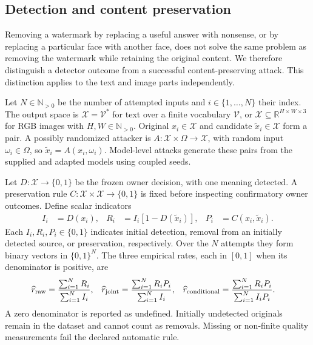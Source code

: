 \subsection{Detection and content preservation}
\label{sec:preservation}
Removing a watermark by replacing a useful answer with nonsense, or by replacing a particular face with another face, does not solve the same problem as removing the watermark while retaining the original content. We therefore distinguish a detector outcome from a successful content-preserving attack. This distinction applies to the text and image parts independently.

Let $N\in\mathbb N_{>0}$ be the number of attempted inputs and $i\in\{1,\ldots,N\}$ their index. The output space is $\mathcal X=\mathcal V^*$ for text over a finite vocabulary $\mathcal V$, or $\mathcal X\subseteq\mathbb R^{H\times W\times3}$ for RGB images with $H,W\in\mathbb N_{>0}$. Original $x_i\in\mathcal X$ and candidate $\widetilde x_i\in\mathcal X$ form a pair. A possibly randomized attacker is $A:\mathcal X\times\Omega\to\mathcal X$, with random input $\omega_i\in\Omega$, so $\widetilde x_i=A(x_i,\omega_i)$. Model-level attacks generate these pairs from the supplied and adapted models using coupled seeds.

Let $D:\mathcal X\to\{0,1\}$ be the frozen owner decision, with one meaning detected. A preservation rule $C:\mathcal X\times\mathcal X\to\{0,1\}$ is fixed before inspecting confirmatory owner outcomes. Define scalar indicators
\begin{align}\label{eq:preservation-indicators}
 I_i&=D(x_i), & R_i&=I_i[1-D(\widetilde x_i)], & P_i&=C(x_i,\widetilde x_i).
\end{align}
Each $I_i,R_i,P_i\in\{0,1\}$ indicates initial detection, removal from an initially detected source, or preservation, respectively. Over the $N$ attempts they form binary vectors in $\{0,1\}^N$. The three empirical rates, each in $[0,1]$ when its denominator is positive, are
\begin{align}\label{eq:removal-rates}
 \widehat r_{\rm raw}&=\frac{\sum_{i=1}^N R_i}{\sum_{i=1}^N I_i}, &
 \widehat r_{\rm joint}&=\frac{\sum_{i=1}^N R_iP_i}{\sum_{i=1}^N I_i}, &
 \widehat r_{\rm conditional}&=\frac{\sum_{i=1}^N R_iP_i}{\sum_{i=1}^N I_iP_i}.
\end{align}
A zero denominator is reported as undefined. Initially undetected originals remain in the dataset and cannot count as removals. Missing or non-finite quality measurements fail the declared automatic rule.

